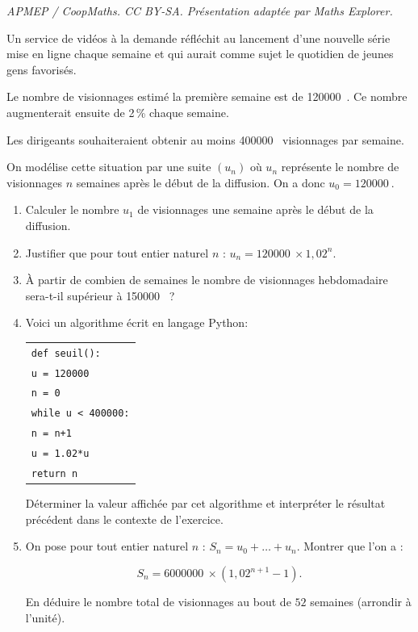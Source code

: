 \documentclass[10pt]{article}
\providecommand{\np}[2][]{{#2~#1}}
\begin{document}
\noindent\textit{APMEP / CoopMaths. CC BY-SA. Présentation adaptée par Maths Explorer.}\par\medskip
\medskip

Un service de vidéos à la demande réfléchit au lancement d'une nouvelle série mise en ligne chaque semaine et qui aurait comme sujet le quotidien de jeunes gens favorisés.

Le nombre de visionnages estimé la première semaine est de \np{120000}. Ce nombre augmenterait ensuite de 2\,\% chaque semaine.

Les dirigeants souhaiteraient obtenir au moins \np{400000} visionnages par semaine.

On modélise cette situation par une suite $\left(u_n\right)$ où $u_n$ représente le nombre de visionnages $n$ semaines après le début de la diffusion. On a donc $u_0 = \np{120000}$.

\medskip

\begin{enumerate}
\item Calculer le nombre $u_1$ de visionnages une semaine après le début de la diffusion. 
\item Justifier que pour tout entier naturel $n$ : $u_n = \np{120000} \times  1,02^n$.
\item À partir de combien de semaines le nombre de visionnages hebdomadaire sera-t-il supérieur à \np{150000} ?
\item Voici un algorithme écrit en langage Python:

\begin{center}
\begin{tabularx}{0.55\linewidth}{X}
\texttt{def seuil():}\\
\quad \texttt{u = 120000}\\
\quad \texttt{n = 0}\\
\quad \texttt{while u < 400000:}\\
\qquad \texttt{n = n+1}\\
\qquad \texttt{u = 1.02*u}\\
\quad \texttt{return n}\\
\end{tabularx}
\end{center}

Déterminer la valeur affichée par cet algorithme et interpréter le résultat précédent
dans le contexte de l'exercice. 

\item On pose pour tout entier naturel $n$ : $S_n = u_0 + \ldots + u_n$. Montrer que l'on a :

\[S_n = \np{6000000} \times \left(1,02^{n+1} - 1\right).\]

En déduire le nombre total de visionnages au bout de $52$ semaines (arrondir à
l'unité).

\end{enumerate}
\end{document}
